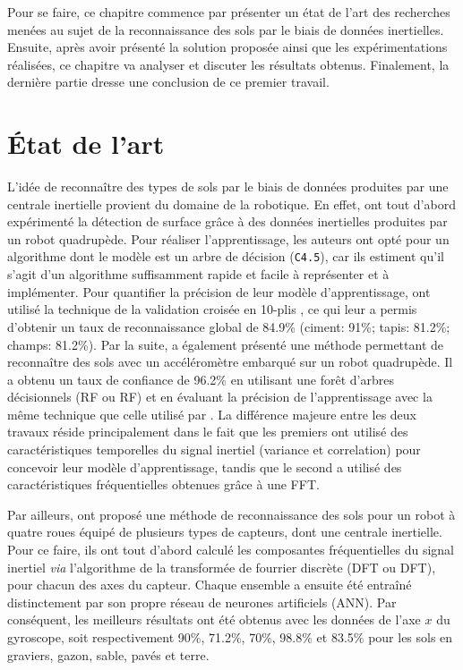 Pour se faire, ce chapitre commence par présenter un état de l'art des recherches menées au sujet de la reconnaissance des sols par le biais de données inertielles. Ensuite, après avoir présenté la solution proposée ainsi que les expérimentations réalisées, ce chapitre va analyser et discuter les résultats obtenus. Finalement, la dernière partie dresse une conclusion de ce premier travail.

\section{État de l'art}
\label{sec:t1-related-work}

L'idée de reconnaître des types de sols par le biais de données produites par une centrale inertielle provient du domaine de la robotique. En effet, \cite{Vail2004} ont tout d'abord expérimenté la détection de surface grâce à des données inertielles produites par un robot quadrupède. Pour réaliser l'apprentissage, les auteurs ont opté pour un algorithme dont le modèle est un arbre de décision (\texttt{C4.5}), car ils estiment qu'il s'agit d'un algorithme suffisamment rapide et facile à représenter et à implémenter. Pour quantifier la précision de leur modèle d'apprentissage, \citeauthor{Vail2004} ont utilisé la technique de la validation croisée en 10-plis \citep{Kohavi1995}, ce qui leur a permis d'obtenir un taux de reconnaissance global de 84.9\% (ciment: 91\%; tapis: 81.2\%; champs: 81.2\%). Par la suite, \cite{Kertesz2016} a également présenté une méthode permettant de reconnaître des sols avec un accéléromètre embarqué sur un robot quadrupède. Il a obtenu un taux de confiance de 96.2\% en utilisant une forêt d’arbres décisionnels (\acl{RF} ou \acs{RF}) et en évaluant la précision de l'apprentissage avec la même technique que celle utilisé par \citeauthor{Vail2004}. La différence majeure entre les deux travaux réside principalement dans le fait que les premiers ont utilisé des caractéristiques temporelles du signal inertiel (variance et correlation) pour concevoir leur modèle d'apprentissage, tandis que le second a utilisé des caractéristiques fréquentielles obtenues grâce à une \acs{FFT}.

Par ailleurs, \cite{Bibuli2007} ont proposé une méthode de reconnaissance des sols pour un robot à quatre roues équipé de plusieurs types de capteurs, dont une centrale inertielle. Pour ce faire, ils ont tout d'abord calculé les composantes fréquentielles du signal inertiel \textit{via} l'algorithme de la transformée de fourrier discrète (\acl{DFT} ou \acs{DFT}), pour chacun des axes du capteur. Chaque ensemble a ensuite été entraîné distinctement par son propre réseau de neurones artificiels (\acs{ANN}). Par conséquent, les meilleurs résultats ont été obtenus avec les données de l'axe $x$ du gyroscope, soit respectivement 90\%, 71.2\%, 70\%, 98.8\% et 83.5\% pour les sols en graviers, gazon, sable, pavés et terre.

